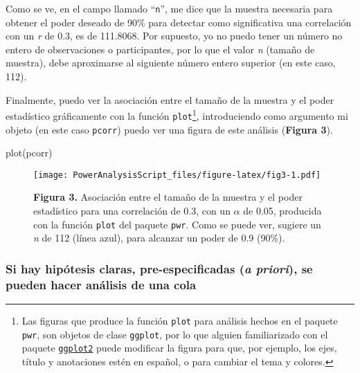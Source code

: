 \documentclass[
]{article}
\newenvironment{Shaded}{\begin{snugshade}}{\end{snugshade}}
\newcommand{\FunctionTok}[1]{\textcolor[rgb]{0.56,0.27,0.68}{#1}}
\newcommand{\NormalTok}[1]{\textcolor[rgb]{0.81,0.81,0.76}{#1}}
\begin{document}
Como se ve, en el campo llamado ``\texttt{n}'', me dice que la muestra
necesaria para obtener el poder deseado de 90\% para detectar como
significativa una correlación con un \emph{r} de 0.3, es de 111.8068.
Por supuesto, yo no puedo tener un número no entero de observaciones o
participantes, por lo que el valor \emph{n} (tamaño de muestra), debe
aproximarse al siguiente número entero superior (en este caso, 112).

Finalmente, puedo ver la asociación entre el tamaño de la muestra y el
poder estadístico gráficamente con la función \texttt{plot}\footnote{Las
  figuras que produce la función \texttt{plot} para análisis hechos en
  el paquete \texttt{pwr}, son objetos de clase \texttt{ggplot}, por lo
  que alguien familiarizado con el paquete
  \href{https://ggplot2.tidyverse.org/}{\texttt{ggplot2}} puede
  modificar la figura para que, por ejemplo, los ejes, título y
  anotaciones estén en español, o para cambiar el tema y colores.},
introduciendo como argumento mi objeto (en este caso \texttt{pcorr})
puedo ver una figura de este análisis (\textbf{Figura 3}).

\begin{Shaded}
\begin{Highlighting}[]
\FunctionTok{plot}\NormalTok{(pcorr)}
\end{Highlighting}
\end{Shaded}

\begin{figure}
\centering
\texttt{[image: PowerAnalysisScript\_files/figure-latex/fig3-1.pdf]}
\caption{\textbf{Figura 3.} Asociación entre el tamaño de la muestra y
el poder estadístico para una correlación de 0.3, con un \(\alpha\) de
0.05, producida con la función \texttt{plot} del paquete \texttt{pwr}.
Como se puede ver, sugiere un \emph{n} de 112 (línea azul), para
alcanzar un poder de 0.9 (90\%).}
\end{figure}

\hypertarget{si-hay-hipuxf3tesis-claras-pre-especificadas-a-priori-se-pueden-hacer-anuxe1lisis-de-una-cola}{%
\subsubsection{\texorpdfstring{Si hay hipótesis claras,
pre-especificadas (\emph{a priori}), se pueden hacer análisis de una
cola}{Si hay hipótesis claras, pre-especificadas (a priori), se pueden hacer análisis de una cola}}\label{si-hay-hipuxf3tesis-claras-pre-especificadas-a-priori-se-pueden-hacer-anuxe1lisis-de-una-cola}}
\end{document}
